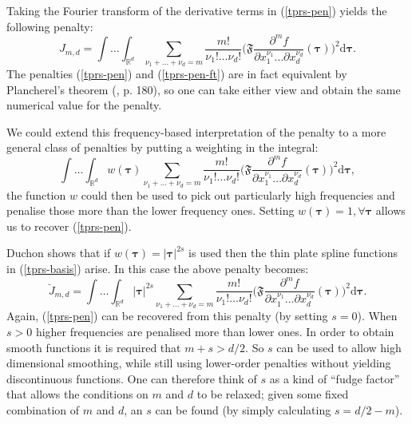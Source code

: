 Taking the Fourier transform of the derivative terms in (\ref{tprs-pen}) yields the following penalty:
\begin{equation}
J_{m,d} = \int \ldots \int_{\mathbb{R}^d} \sum_{\nu_1 + \dots + \nu_d=m} \frac{m!}{\nu_1! \dots \nu_d!}\Big( \mathfrak{F} \frac{\partial^m f}{\partial x_1^{\nu_1} \ldots  \partial x_d^{\nu_d}}(\boldsymbol{\tau}) \Big)^2 \text{d} \boldsymbol{\tau}.
\label{tprs-pen-ft}
\end{equation}
The penalties (\ref{tprs-pen}) and (\ref{tprs-pen-ft}) are in fact equivalent by Plancherel's theorem (\cite{vretblad}, p. 180), so one can take either view and obtain the same numerical value for the penalty. 

We could extend this frequency-based interpretation of the penalty to a more general class of penalties by putting a weighting in the integral:
\begin{equation}
\int \ldots \int_{\mathbb{R}^d} w(\boldsymbol{\tau}) \sum_{\nu_1 + \dots + \nu_d=m} \frac{m!}{\nu_1! \dots \nu_d!}\Big( \mathfrak{F} \frac{\partial^m f}{\partial x_1^{\nu_1} \ldots  \partial x_d^{\nu_d}}(\boldsymbol{\tau}) \Big)^2 \text{d} \boldsymbol{\tau},
\label{duchon-penalty-general}
\end{equation}
the function $w$ could then be used to pick out particularly high frequencies and penalise those more than the lower frequency ones. Setting $w(\boldsymbol{\tau})=1, \forall \boldsymbol{\tau}$ allows us to recover (\ref{tprs-pen}).

Duchon shows that if $w(\boldsymbol{\tau})= \lvert \boldsymbol{\tau} \rvert^{2s}$ is used then the thin plate spline functions in (\ref{tprs-basis}) arise. In this case the above penalty becomes:
\begin{equation}
\breve{J}_{m,d} = \int \ldots \int_{\mathbb{R}^d} \lvert \boldsymbol{\tau} \rvert^{2s} \sum_{\nu_1 + \dots + \nu_d=m} \frac{m!}{\nu_1! \dots \nu_d!}\Big( \mathfrak{F} \frac{\partial^m f}{\partial x_1^{\nu_1} \ldots  \partial x_d^{\nu_d}}(\boldsymbol{\tau}) \Big)^2 \text{d} \boldsymbol{\tau}.
\label{duchon-penalty}
\end{equation}
Again, (\ref{tprs-pen}) can be recovered from this penalty (by setting $s=0$). When $s>0$ higher frequencies are penalised more than lower ones. In order to obtain smooth functions it is required that $m+s>d/2$. So $s$ can be used to allow high dimensional smoothing, while still using lower-order penalties without yielding discontinuous functions. One can therefore think of $s$ as a kind of ``fudge factor'' that allows the conditions on $m$ and $d$ to be relaxed; given some fixed combination of $m$ and $d$, an $s$ can be found (by simply calculating $s=d/2-m$).

